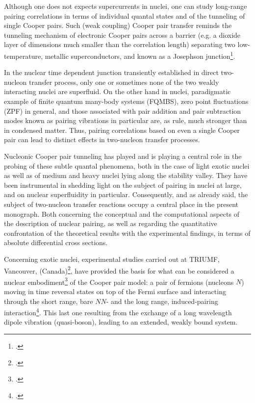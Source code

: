  
Although one does not expects supercurrents in nuclei, one can study long-range pairing correlations in terms of individual quantal states and of the tunneling of single Cooper pairs. Such (weak coupling) Cooper pair transfer reminds  the tunneling mechanism of electronic Cooper pairs across a barrier (e.g. a dioxide layer of dimensions much smaller than the correlation length) separating two low-temperature, metallic superconductors, and known as a Josephson junction\footnote{\cite{Josephson:62,Anderson:64b}.}.
  
  
In the nuclear time dependent junction transiently established in  direct two-nucleon transfer process, only one or sometimes none of the two weakly interacting nuclei are superfluid.  On the other hand in nuclei, paradigmatic example of finite quantum   many-body systems (FQMBS), zero point fluctuations  (ZPF) in general, and those associated with pair addition and pair subtraction modes known as pairing vibrations in particular are, as  rule, much stronger than in condensed matter. Thus, pairing correlations based on even  a single Cooper pair can lead to distinct  effects in two-nucleon transfer processes. 
  
  
Nucleonic Cooper pair tunneling has played and is playing a central role in the probing of these subtle quantal phenomena, both in the case of  light exotic nuclei as well as of medium and heavy nuclei lying along the stability valley. They  have been instrumental in shedding light on the subject of pairing in nuclei at large, and on nuclear superfluidity in particular. Consequently, and as already said, the subject of two-nucleon transfer reactions occupy  a central place in the present monograph. Both concerning the conceptual and the computational aspects of the description of nuclear pairing, as well as regarding the quantitative confrontation of the theoretical  results  with the experimental findings, in terms of absolute differential cross sections.
 

Concerning exotic nuclei, experimental studies carried out at TRIUMF, Vancouver, (Canada)\footnote{\cite{Tanihata:08}.}, have provided the basis for what can be considered a nuclear embodiment\footnote{\cite{Barranco:01,Potel:10}.} of the Cooper pair model: a pair of fermions (nucleons $N$) moving in time reversal states on top of the Fermi surface and interacting through the short range, bare $NN$- and the long range, induced-pairing interaction\footnote{\cite{Frohlich:52,Bardeen:55}.}. This last one resulting from the exchange of a long wavelength dipole vibration (quasi-boson), leading to an extended, weakly bound system.

